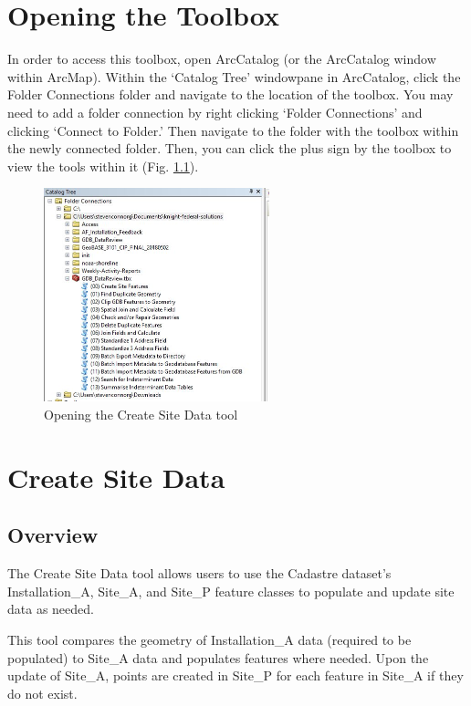 \documentclass[openany]{book}
\theoremstyle{definition}
\theoremstyle{definition}
\theoremstyle{definition}
\theoremstyle{remark}
\begin{document}
\chapter{Opening the Toolbox}\label{opening-the-toolbox}

In order to access this toolbox, open ArcCatalog (or the ArcCatalog
window within ArcMap). Within the `Catalog Tree' windowpane in
ArcCatalog, click the Folder Connections folder and navigate to the
location of the toolbox. You may need to add a folder connection by
right clicking `Folder Connections' and clicking `Connect to Folder.'
Then navigate to the folder with the toolbox within the newly connected
folder. Then, you can click the plus sign by the toolbox to view the
tools within it (Fig. \ref{fig:opentoolbox}).

\begin{figure}[H]

{\centering \includegraphics[width=2.57in,]{figures/opentoolbox} 

}

\caption{Opening the Create Site Data tool}\label{fig:opentoolbox}
\end{figure}

\pagebreak
\printindex

\chapter{Create Site Data}\label{siteData}

\section{Overview}\label{overview}

The Create Site Data tool allows users to use the Cadastre dataset's
Installation\_A, Site\_A, and Site\_P feature classes to populate and
update site data as needed.

This tool compares the geometry of Installation\_A data (required to be
populated) to Site\_A data and populates features where needed. Upon the
update of Site\_A, points are created in Site\_P for each feature in
Site\_A if they do not exist.
\end{document}
